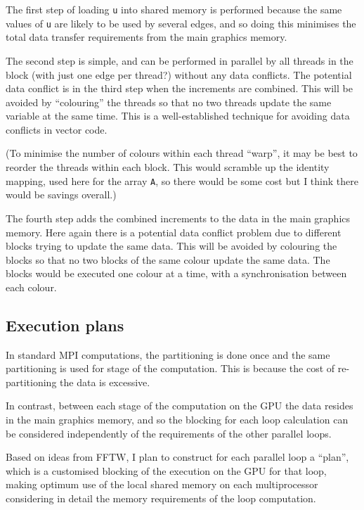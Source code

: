 \documentclass[12pt]{article}
\begin{document}
The first step of loading \verb!u! into shared memory is performed because
the same values of \verb!u! are likely to be used by several edges, and
so doing this minimises the total data transfer requirements from the main 
graphics memory.
  
The second step is simple, and can be performed in parallel by all threads 
in the block (with just one edge per thread?) without any data conflicts.  
The potential data conflict is in the third step when the increments are 
combined.  This will be avoided by ``colouring'' the threads so that no 
two threads update the same variable at the same time.  This is a 
well-established technique for avoiding data conflicts in vector code.

(To minimise the number of colours within each thread ``warp'', it may
be best to reorder the threads within each block.  This would scramble 
up the identity mapping, used here for the array \verb!A!, so there would 
be some cost but I think there would be savings overall.)

The fourth step adds the combined increments to the data in the main 
graphics memory.  Here again there is a potential data conflict problem 
due to different blocks trying to update the same data.  This will be 
avoided by colouring the blocks so that no two blocks of the same colour 
update the same data.  The blocks would be executed one colour at a time, 
with a synchronisation between each colour.


\subsection{Execution plans}

In standard MPI computations, the partitioning is done once and the same
partitioning is used for stage of the computation.  This is because 
the cost of re-partitioning the data is excessive.

In contrast, between each stage of the computation on the GPU the data 
resides in the main graphics memory, and so the blocking for each loop 
calculation can be considered independently of the requirements of the
other parallel loops.

Based on ideas from FFTW, I plan to construct for each parallel loop
a ``plan'', which is a customised blocking of the execution on the GPU 
for that loop, making optimum use of the local shared memory on each 
multiprocessor considering in detail the memory requirements of the loop 
computation.  
\end{document}
